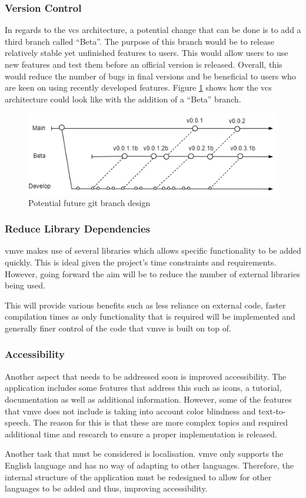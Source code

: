 \documentclass[11pt]{article}
\begin{document}
\subsubsection{Version Control}
In regards to the \gls*{vcs} architecture, a potential change that can be done is
to add a third branch called ``Beta''. The purpose of this branch would be to
release relatively stable yet unfinished features to users. This would allow
users to use new features and test them before an official version is released.
Overall, this would reduce the number of bugs in final versions and be
beneficial to users who are keen on using recently developed features. Figure
\ref{fig:futurebrancharch} shows how the \gls*{vcs} architecture could look like
with the addition of a ``Beta'' branch.

\begin{figure}[H]
  \centering
  \includegraphics[width=\textwidth]{images/future_branch_design.png}
  \caption{Potential future git branch design}
  \label{fig:futurebrancharch}
\end{figure}

\subsubsection{Reduce Library Dependencies}
\gls*{vmve} makes use of several libraries which allows specific functionality to
be added quickly. This is ideal given the project's time constraints and
requirements. However, going forward the aim will be to reduce the number of
external libraries being used.

This will provide various benefits such as less reliance on external code,
faster compilation times as only functionality that is required will be
implemented and generally finer control of the code that \gls*{vmve} is built on
top of.

\subsubsection{Accessibility}
Another aspect that needs to be addressed soon is improved accessibility. The
application includes some features that address this such as icons, a tutorial,
documentation as well as additional information. However, some of the features
that \gls*{vmve} does not include is taking into account color blindness and
text-to-speech. The reason for this is that these are more complex topics and
required additional time and research to ensure a proper implementation is
released.

Another task that must be considered is localisation. \gls*{vmve} only supports
the English language and has no way of adapting to other languages. Therefore,
the internal structure of the application must be redesigned to allow for
other languages to be added and thus, improving accessibility.
\end{document}
